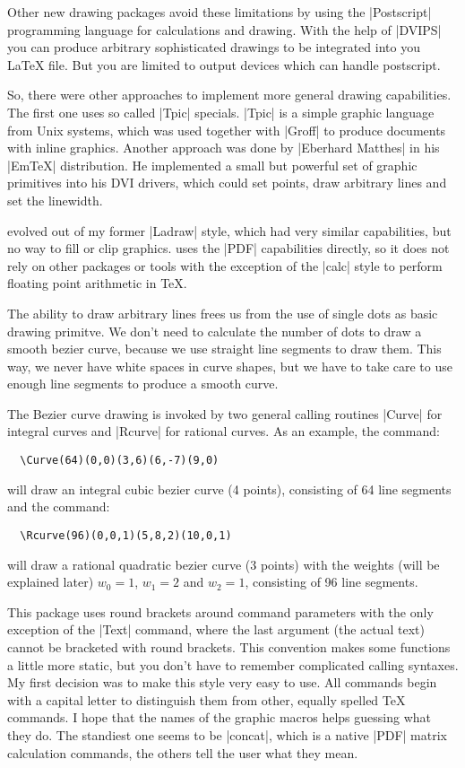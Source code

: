 \documentclass[a4paper,11pt]{article}
\begin{document}
Other new drawing packages avoid these limitations by using the |Postscript|
programming language for calculations and drawing. With the help of |DVIPS|
you can produce arbitrary sophisticated drawings to be integrated into you
\LaTeX{} file. But you are limited to output devices which can handle postscript.

So, there were other approaches to implement more general drawing capabilities.
The first one uses so called |Tpic| specials. |Tpic| is a simple graphic
language from Unix systems, which was used together with |Groff| to produce
documents with inline graphics. Another approach was done by
|Eberhard Matthes| in his |EmTeX| distribution. He implemented a small but
powerful set of graphic primitives into his DVI drivers, which could set
points, draw arbitrary lines and set the linewidth.

\Lapdf{} evolved out of my former |Ladraw| style, which had very similar
capabilities, but no way to fill or clip graphics. \Lapdf{} uses the |PDF|
capabilities directly, so it does not rely on other packages or tools with the
exception of the |calc| style to perform floating point arithmetic in \TeX{}.

The ability to draw arbitrary lines frees us from the use of single dots as
basic drawing primitve. We don't need to calculate the number of dots to draw
a smooth bezier curve, because we use straight line segments to draw them. This
way, we never have white spaces in curve shapes, but we have to take care to use
enough line segments to produce a smooth curve.

The Bezier curve drawing is invoked by two general calling routines |Curve|
for integral curves and |Rcurve| for rational curves. As an example, the
command:
\begin{verbatim}
  \Curve(64)(0,0)(3,6)(6,-7)(9,0)
\end{verbatim}
will draw an integral cubic bezier curve (4 points), consisting of 64 line segments
and the command:
\begin{verbatim}
  \Rcurve(96)(0,0,1)(5,8,2)(10,0,1)
\end{verbatim}
will draw a  rational quadratic bezier curve (3 points) with the weights (will be
explained later) $w_0=1$, $w_1=2$ and $w_2=1$, consisting of 96 line segments.

This package uses round brackets around command parameters with the only
exception of the |Text| command, where the last argument (the actual text)
cannot be bracketed with round brackets. This convention makes some functions
a little more static, but you don't have to remember complicated calling
syntaxes. My first decision was to make this style very easy to use. All
\Lapdf{} commands begin with a capital letter to distinguish them from other,
equally spelled \TeX{} commands. I hope that the names of the graphic macros
helps guessing what they do. The standiest one seems to be |concat|, which
is a native |PDF| matrix calculation commands, the others tell the user
what they mean.
\end{document}
